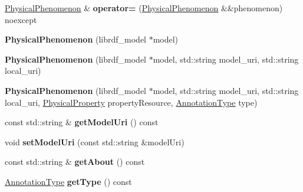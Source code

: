 \begin{DoxyCompactItemize}
\mbox{\label{classomexmeta_1_1PhysicalPhenomenon_af15355b4c2a361b4b02dca02d3877aed}} 
\hyperlink{classomexmeta_1_1PhysicalPhenomenon}{Physical\+Phenomenon} \& {\bfseries operator=} (\hyperlink{classomexmeta_1_1PhysicalPhenomenon}{Physical\+Phenomenon} \&\&phenomenon) noexcept
\item 
\mbox{\label{classomexmeta_1_1PhysicalPhenomenon_aa140516da97b03960175f9bc04ecf865}} 
{\bfseries Physical\+Phenomenon} (librdf\+\_\+model $\ast$model)
\item 
\mbox{\label{classomexmeta_1_1PhysicalPhenomenon_a5c831ca76c36121b0fbc7b122b5539ac}} 
{\bfseries Physical\+Phenomenon} (librdf\+\_\+model $\ast$model, std\+::string model\+\_\+uri, std\+::string local\+\_\+uri)
\item 
\mbox{\label{classomexmeta_1_1PhysicalPhenomenon_a93bf263f7fdb65bd3e8de97983a7186b}} 
{\bfseries Physical\+Phenomenon} (librdf\+\_\+model $\ast$model, std\+::string model\+\_\+uri, std\+::string local\+\_\+uri, \hyperlink{classomexmeta_1_1PhysicalProperty}{Physical\+Property} property\+Resource, \hyperlink{namespaceomexmeta_a1129ebb8a92218ebb27b9c76ac8462f7}{Annotation\+Type} type)
\item 
\mbox{\label{classomexmeta_1_1PhysicalPhenomenon_a5528b12e5dbc702c0c270328662e7031}} 
const std\+::string \& {\bfseries get\+Model\+Uri} () const
\item 
\mbox{\label{classomexmeta_1_1PhysicalPhenomenon_aa1fd9929fb2e07fa20081b1a4c00c9d2}} 
void {\bfseries set\+Model\+Uri} (const std\+::string \&model\+Uri)
\item 
\mbox{\label{classomexmeta_1_1PhysicalPhenomenon_a8be912d1256d6b913c4965f96f1b730b}} 
const std\+::string \& {\bfseries get\+About} () const
\item 
\mbox{\label{classomexmeta_1_1PhysicalPhenomenon_a9676a1dcc458247a19d19cda16d640f4}} 
\hyperlink{namespaceomexmeta_a1129ebb8a92218ebb27b9c76ac8462f7}{Annotation\+Type} {\bfseries get\+Type} () const

\end{DoxyCompactItemize}
